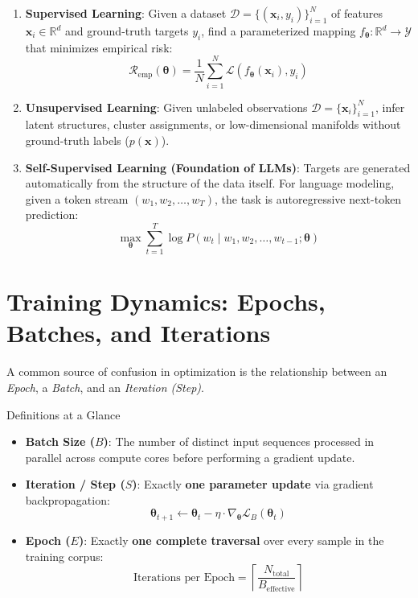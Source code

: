\documentclass[11pt,a4paper]{article}
\begin{document}
\begin{enumerate}
    \item \textbf{Supervised Learning}: Given a dataset $\mathcal{D} = \{(\bm{x}_i, y_i)\}_{i=1}^N$ of features $\bm{x}_i \in \mathbb{R}^d$ and ground-truth targets $y_i$, find a parameterized mapping $f_{\bm{\theta}}: \mathbb{R}^d \to \mathcal{Y}$ that minimizes empirical risk:
    \begin{equation}
        \mathcal{R}_{\text{emp}}(\bm{\theta}) = \frac{1}{N} \sum_{i=1}^N \mathcal{L}(f_{\bm{\theta}}(\bm{x}_i), y_i)
    \end{equation}
    \item \textbf{Unsupervised Learning}: Given unlabeled observations $\mathcal{D} = \{\bm{x}_i\}_{i=1}^N$, infer latent structures, cluster assignments, or low-dimensional manifolds without ground-truth labels ($p(\bm{x})$).
    \item \textbf{Self-Supervised Learning (Foundation of LLMs)}: Targets are generated automatically from the structure of the data itself. For language modeling, given a token stream $(w_1, w_2, \dots, w_T)$, the task is autoregressive next-token prediction:
    \begin{equation}
        \max_{\bm{\theta}} \sum_{t=1}^T \log P(w_t \mid w_1, w_2, \dots, w_{t-1}; \bm{\theta})
    \end{equation}
\end{enumerate}

\section{Training Dynamics: Epochs, Batches, and Iterations}

A common source of confusion in optimization is the relationship between an \textit{Epoch}, a \textit{Batch}, and an \textit{Iteration (Step)}.

\begin{conceptbox}{Definitions at a Glance}
\begin{itemize}
    \item \textbf{Batch Size ($B$)}: The number of distinct input sequences processed in parallel across compute cores before performing a gradient update.
    \item \textbf{Iteration / Step ($S$)}: Exactly \textbf{one parameter update} via gradient backpropagation:
    $$\bm{\theta}_{t+1} \leftarrow \bm{\theta}_t - \eta \cdot \nabla_{\bm{\theta}} \mathcal{L}_B(\bm{\theta}_t)$$
    \item \textbf{Epoch ($E$)}: Exactly \textbf{one complete traversal} over every sample in the training corpus:
    $$\text{Iterations per Epoch} = \left\lceil \frac{N_{\text{total}}}{B_{\text{effective}}} \right\rceil$$
\end{itemize}
\end{conceptbox}
\end{document}
